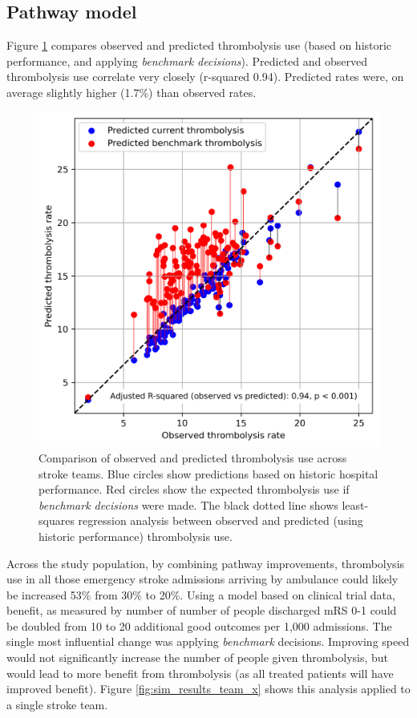 \normalsize

\subsection{Pathway model}

Figure \ref{fig:thrombolysis_rates_teams} compares observed and predicted thrombolysis use (based on historic performance, and applying \textit{benchmark decisions}). Predicted and observed thrombolysis use correlate very closely (r-squared 0.94). Predicted rates were, on average slightly higher (1.7\%) than observed rates.

\begin{figure}
    \centering
    \includegraphics[width=0.5\linewidth]{images/thrombolysis_rates_model}
    \caption{Comparison of observed and predicted thrombolysis use across stroke teams. Blue circles show predictions based on historic hospital performance. Red circles show the expected thrombolysis use if \textit{benchmark decisions} were made. The black dotted line shows least-squares regression analysis between observed and predicted (using historic performance) thrombolysis use.}
    \label{fig:thrombolysis_rates_teams}
\end{figure}


Across the study population, by combining pathway improvements, thrombolysis use in all those emergency stroke admissions arriving by ambulance could likely be increased 53\% from 30\% to 20\%. Using a model based on clinical trial data, benefit, as measured by number of number of people discharged mRS 0-1 could be doubled from 10 to 20 additional good outcomes per 1,000 admissions. The single most influential change was applying \textit{benchmark} decisions. Improving speed would not significantly increase the number of people given thrombolysis, but would lead to more benefit from thrombolysis (as all treated patients will have improved benefit). Figure \ref{fig:sim_results_team_x} shows this analysis applied to a single stroke team.


